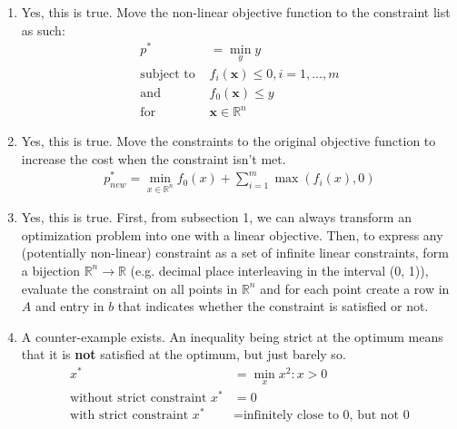 \documentclass[11pt]{article}
\begin{document}
\begin{solution}
\begin{enumerate}
\item Yes, this is true. Move the non-linear objective function to the constraint list as such:
\begin{align*}
    p^* &= \min_{y} y \\
    \text{subject to } &f_i(\bm{x}) \leq 0, i = 1,\dots,m \\
    \text{and } &f_0(\bm{x}) \leq y \\
    \text{for } &\bm{x} \in \mathbb{R}^n
\end{align*}

\item Yes, this is true. Move the constraints to the original objective function to increase the cost when the constraint isn't met.
\begin{align*}
    p_{new}^* = \min_{x \in \mathbb{R}^n} f_0(x) + \sum_{i=1}^m \max(f_i(x),0)
\end{align*}

\item Yes, this is true. First, from subsection 1, we can always transform an optimization problem into one with a linear objective. Then, to express any (potentially non-linear) constraint as a set of infinite linear constraints, form a bijection $\mathbb{R}^n \rightarrow \mathbb{R}$ (e.g. decimal place interleaving in the interval (0, 1)), evaluate the constraint on all points in $\mathbb{R}^n$ and for each point create a row in $A$ and entry in $b$ that indicates whether the constraint is satisfied or not.

\item A counter-example exists. An inequality being strict at the optimum means that it is \textbf{not} satisfied at the optimum, but just barely so.
\begin{align*}
    x^* &= \min_{x} x^2 : x > 0 \\
    \text{without strict constraint } x^* &= 0 \\
    \text{with strict constraint } x^* &= \text{infinitely close to 0, but not 0}
\end{align*}


\end{enumerate}
\end{solution}
\end{document}
